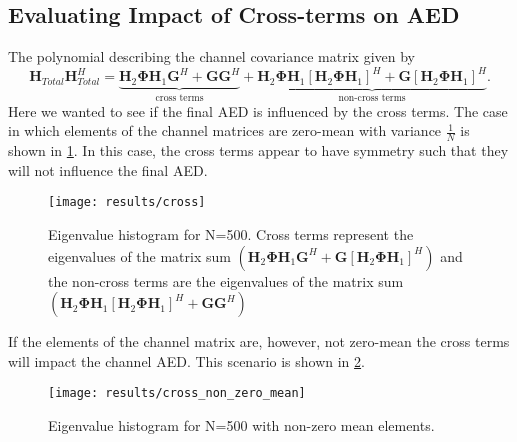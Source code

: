 \documentclass[12pt,a4paper]{report}
\begin{document}
\subsection{Evaluating Impact of Cross-terms on AED}\label{cross_terms}
The polynomial describing the channel
covariance matrix given by 
\begin{equation}
\mathbf{H}_{Total}\mathbf{H}_{Total}^H = 
\underbrace{
\mathbf{H}_{2}\boldsymbol{\Phi}\mathbf{H}_{1}\mathbf{G}^H + \mathbf{G}\mathbf{G}^H}_{\text{cross terms}}
+ 
\underbrace{
\mathbf{H}_{2}\boldsymbol{\Phi}\mathbf{H}_{1}[\mathbf{H}_{2}\boldsymbol{\Phi}\mathbf{H}_{1}]^H + \mathbf{G}[\mathbf{H}_{2}\boldsymbol{\Phi}\mathbf{H}_{1}]^H}_{\text{non-cross terms}}.
\end{equation} 
Here we wanted to see if the final AED is influenced by the cross terms. The case in which elements of the channel matrices are zero-mean with variance  $\frac{1}{N}$ is shown in \ref{cross}. In this case, the cross terms appear to have symmetry such that they will not influence the final AED.

\begin{figure}[H]
	\texttt{[image: results/cross]}
\caption{Eigenvalue histogram for N=500. Cross terms represent the eigenvalues of the matrix sum $(\mathbf{H}_{2}\boldsymbol{\Phi}\mathbf{H}_{1}\mathbf{G}^H + \mathbf{G}[\mathbf{H}_{2}\boldsymbol{\Phi}\mathbf{H}_{1}]^H)$ and the non-cross terms are the eigenvalues of the matrix sum $(\mathbf{H}_{2}\boldsymbol{\Phi}\mathbf{H}_{1}[\mathbf{H}_{2}\boldsymbol{\Phi}\mathbf{H}_{1}]^H + \mathbf{G}\mathbf{G}^H)$}
\label{cross}
\end{figure}

If the elements of the channel matrix are, however, not zero-mean the cross terms will impact the channel AED. 
This scenario is shown in \ref{cross_non_zero_mean}.

\begin{figure}[H]
	\texttt{[image: results/cross\_non\_zero\_mean]}
\caption{Eigenvalue histogram for N=500 with non-zero mean elements.}
\label{cross_non_zero_mean}
\end{figure}
\end{document}

